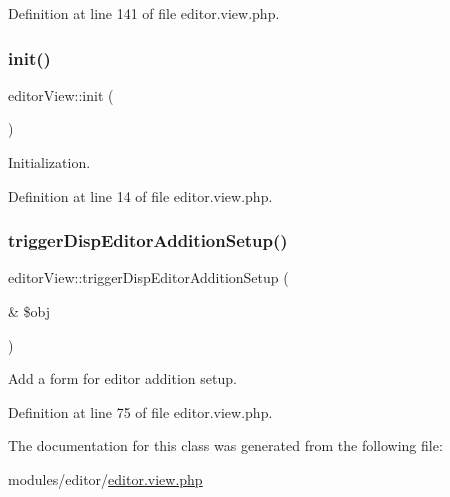 Definition at line 141 of file editor.\+view.\+php.

\hypertarget{classeditorView_af9e607b227f16e0bf0f1162a968197e9}{}\label{classeditorView_af9e607b227f16e0bf0f1162a968197e9} 
\subsubsection{\texorpdfstring{init()}{init()}}
{\footnotesize\ttfamily editor\+View\+::init (\begin{DoxyParamCaption}{ }\end{DoxyParamCaption})}



Initialization. 



Definition at line 14 of file editor.\+view.\+php.

\hypertarget{classeditorView_a64fdf2f32fe2d617ae33162b41058d17}{}\label{classeditorView_a64fdf2f32fe2d617ae33162b41058d17} 
\subsubsection{\texorpdfstring{trigger\+Disp\+Editor\+Addition\+Setup()}{triggerDispEditorAdditionSetup()}}
{\footnotesize\ttfamily editor\+View\+::trigger\+Disp\+Editor\+Addition\+Setup (\begin{DoxyParamCaption}\item[{\&}]{\$obj }\end{DoxyParamCaption})}



Add a form for editor addition setup. 



Definition at line 75 of file editor.\+view.\+php.



The documentation for this class was generated from the following file\+:\begin{DoxyCompactItemize}
\item 
modules/editor/\hyperlink{editor_8view_8php}{editor.\+view.\+php}\end{DoxyCompactItemize}
